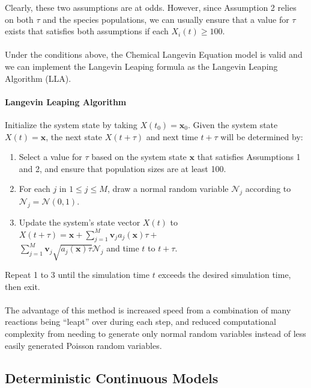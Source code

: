 \documentclass[ugrad,lot,lof,openright,11pt,oneside,onehalfspace]{RUthesis}
\begin{document}
				\noindent
				Clearly, these two assumptions are at odds. However, since Assumption 2 relies on both $\tau$ and the species populations, we can usually ensure that a value for $\tau$ exists that satisfies both assumptions if each $X_i(t) \geq 100$.\\
				\\
				Under the conditions above, the Chemical Langevin Equation model is valid and we can implement the Langevin Leaping formula as the Langevin Leaping Algorithm (LLA).

				\paragraph{Langevin Leaping Algorithm}
				Initialize the system state by taking $X(t_0) = \mathbf{x}_0$. Given the system state $X(t) = \mathbf{x}$, the next state $X(t+\tau)$ and next time $t+\tau$ will be determined by:

				\begin{enumerate}
					\item Select a value for $\tau$ based on the system state $\mathbf{x}$ that satisfies Assumptions 1 and 2, and ensure that population sizes are at least 100.
					\item For each $j$ in $1 \leq j \leq M$, draw a normal random variable $\mathcal{N}_j$ according to $\mathcal{N}_j = \mathcal{N}(0,1)$.
					\item Update the system's state vector $X(t)$ to $X(t+\tau) = \mathbf{x} + \sum_{j=1}^{M} \mathbf{v}_j a_j(\mathbf{x})\tau +$ \\ $\sum_{j=1}^{M} \mathbf{v}_j \sqrt{a_j(\mathbf{x})\tau}\mathcal{N}_j$ and time $t$ to $t+\tau$.
				\end{enumerate}

				\noindent
				Repeat 1 to 3 until the simulation time $t$ exceeds the desired simulation time, then exit.\\
				\\
				The advantage of this method is increased speed from a combination of many reactions being ``leapt'' over during each step, and reduced computational complexity from needing to generate only normal random variables instead of less easily generated Poisson random variables.

		\subsection{Deterministic Continuous Models}
\end{document}
